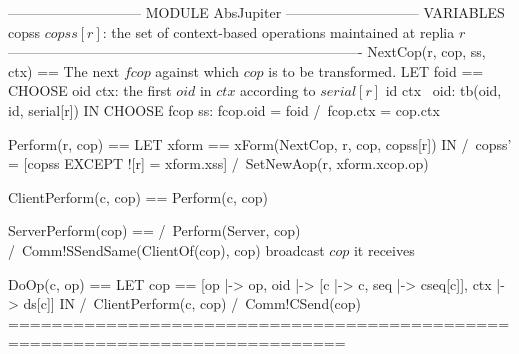 \documentclass{article}
\begin{document}
\begin{tla}
----------------------------- MODULE AbsJupiter -----------------------------
VARIABLES copss \* $copss[r]$: the set of context-based operations maintained at replia $r$
----------------------------------------------------------------------------
NextCop(r, cop, ss, ctx) == \* The next $fcop$ against which $cop$ is to be transformed.
    LET foid == CHOOSE oid \in ctx: \* the first $oid$ in $ctx$ according to $serial[r]$
                    \A id \in ctx \ {oid}: tb(oid, id, serial[r])
    IN  CHOOSE fcop \in ss: fcop.oid = foid /\ fcop.ctx = cop.ctx 

Perform(r, cop) ==
    LET xform == xForm(NextCop, r, cop, copss[r])
    IN  /\ copss' = [copss EXCEPT ![r] = xform.xss]
        /\ SetNewAop(r, xform.xcop.op)
        
ClientPerform(c, cop) == Perform(c, cop)
        
ServerPerform(cop) == 
    /\ Perform(Server, cop)
    /\ Comm!SSendSame(ClientOf(cop), cop) \* broadcast $cop$ it receives

DoOp(c, op) ==
    LET cop == [op |-> op, oid |-> [c |-> c, seq |-> cseq[c]], ctx |-> ds[c]]
    IN  /\ ClientPerform(c, cop)
        /\ Comm!CSend(cop) 
=============================================================================
\end{tla}
\end{document}

